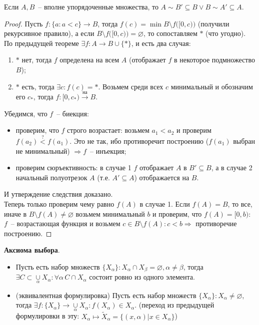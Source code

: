 \begin{cor}
	Если $A, B$~-- вполне упорядоченные множества, то $A \sim B' \subseteq B \lor B \sim A' \subseteq A$.
\end{cor}
\begin{proof}
	Пусть $f: \{a: a<c\} \to B$, тогда $f(c) = \min{B \setminus f\big( [0,c) \big)}$ (получили рекурсивное правило), а если $B \setminus f\big( [0,c) \big) = \varnothing$, то сопоставляем $*$ (что угодно). По предыдущей теореме $\exists f: A \to B \cup \{*\}$, и есть два случая:
	\begin{enumerate}
		\item $*$ нет, тогда $f$ определена на всем $A$ (отображает $f$ в некоторое подмножество $B$);
		\item $*$ есть, тогда $\exists c: f(c) = *$. Возьмем среди всех $c$ минимальный и обозначим его $c_*$, тогда $f: [0, c_*) \stackrel{на}{\longrightarrow} B$.
	\end{enumerate}
	Убедимся, что $f$~-- биекция:
	\begin{itemize}
		\item проверим, что $f$ строго возрастает: возьмем $a_1 < a_2$ и проверим $f(a_2) \overset{?}{<} f(a_1)$. Это не так, ибо противоречит построению ($f(a_1)$ выбран не минимальный) $\Rightarrow f$~-- инъекция;
		\item проверим сюръективность: в случае 1 $f$ отображает $A$ в $B' \subseteq B$, а в случае 2 начальный полуотрезок $A$ (т.е. $A' \subseteq A$) отображается на $B$.
	\end{itemize}
	И утверждение следствия доказано.\\
	Теперь только проверим чему равно $f(A)$ в случае 1. Если $f(A)=B$, то все, иначе в $B \setminus f(A) \neq \varnothing$ возьмем минимальный $b$ и проверим, что $f(A) = [0,b)$: $f$~-- возрастающая функция и возьмем $c \in B \setminus f(A): c < b \Rightarrow$ противоречие построению.\pagebreak
\end{proof}

\textbf{Аксиома выбора}.
\begin{itemize}
	\item Пусть есть набор множеств $\{X_\alpha\}: X_\alpha \cap X_\beta = \varnothing, \alpha \neq \beta$, тогда $\exists C \subset \underset{\alpha}{\cup} X_\alpha: \forall \alpha\, C \cap X_\alpha$ состоит ровно из одного элемента.
	\item (эквивалентная формулировка) Пусть есть набор множеств $\{X_\alpha\}: X_\alpha \neq \varnothing$, тогда $\exists f: \{X_\alpha\} \to \underset{\alpha}{\cup} X_\alpha: f(X_\alpha) \in X_\alpha$. (переход из предыдущей формулировки в эту: $X_\alpha \mapsto \tilde{X}_\alpha = \{(x,\alpha) | x \in X_\alpha\}$)
\end{itemize}

